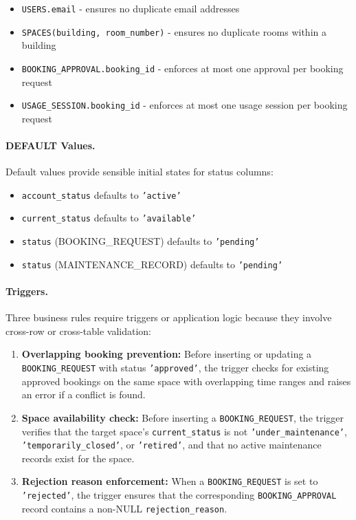 \begin{itemize}
	\item \texttt{USERS.email} - ensures no duplicate email addresses
	\item \texttt{SPACES(building, room\_number)} - ensures no duplicate rooms within a building
	\item \texttt{BOOKING\_APPROVAL.booking\_id} - enforces at most one approval per booking request
	\item \texttt{USAGE\_SESSION.booking\_id} - enforces at most one usage session per booking request
\end{itemize}

\paragraph{DEFAULT Values.}
Default values provide sensible initial states for status columns:

\begin{itemize}
	\item \texttt{account\_status} defaults to \texttt{'active'}
	\item \texttt{current\_status} defaults to \texttt{'available'}
	\item \texttt{status} (BOOKING\_REQUEST) defaults to \texttt{'pending'}
	\item \texttt{status} (MAINTENANCE\_RECORD) defaults to \texttt{'pending'}
\end{itemize}

\paragraph{Triggers.}
Three business rules require triggers or application logic because they involve cross-row or cross-table validation:

\begin{enumerate}
	\item \textbf{Overlapping booking prevention:} Before inserting or updating a \texttt{BOOKING\_REQUEST} with status \texttt{'approved'}, the trigger checks for existing approved bookings on the same space with overlapping time ranges and raises an error if a conflict is found.
	\item \textbf{Space availability check:} Before inserting a \texttt{BOOKING\_REQUEST}, the trigger verifies that the target space's \texttt{current\_status} is not \texttt{'under\_maintenance'}, \\ \texttt{'temporarily\_closed'}, or \texttt{'retired'}, and that no active maintenance records exist for the space.
	\item \textbf{Rejection reason enforcement:} When a \texttt{BOOKING\_REQUEST} is set to \texttt{'rejected'}, the trigger ensures that the corresponding \texttt{BOOKING\_APPROVAL} record contains a non-NULL \texttt{rejection\_reason}.
\end{enumerate}

